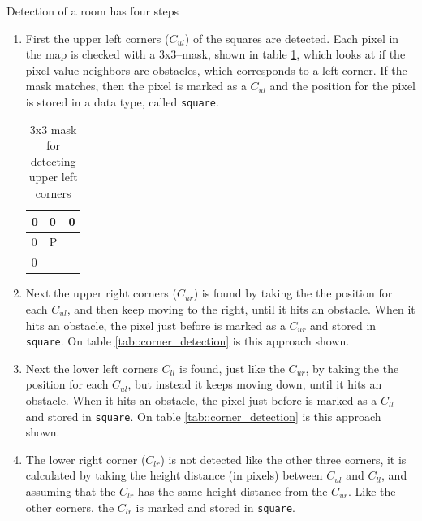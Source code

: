 Detection of a room has four steps
\begin{enumerate}\itemsep-3pt
\item First the upper left corners ($C_{ul}$) of the squares are detected. Each pixel in the map is checked with a 3x3--mask, shown in table \ref{tab::ul_mask}, which looks at if the pixel value neighbors are obstacles, which corresponds to a left corner. If the mask matches, then the pixel is marked as a $C_{ul}$ and the position for the pixel is stored in a data type, called \lstinline|square|. 

\begin{table}[H]
\centering
\begin{tabular}{|l|l|l|}
\hline
0 & 0 & 0 \\ \hline
0 & P &   \\ \hline
0 &   &   \\ \hline
\end{tabular}
\caption{3x3 mask for detecting upper left corners}
\label{tab::ul_mask}
\end{table}

\item Next the upper right corners ($C_{ur}$) is found by taking the the position for each $C_{ul}$, and then keep moving to the right, until it hits an obstacle. When it hits an obstacle, the pixel just before is marked as a $C_{ur}$ and stored in \lstinline|square|. On table \ref{tab::corner_detection} is this approach shown.
\item Next the lower left corners $C_{ll}$ is found, just like the $C_{ur}$, by taking the the position for each $C_{ul}$, but instead it keeps moving down, until it hits an obstacle. When it hits an obstacle, the pixel just before is marked as a $C_{ll}$ and stored in \lstinline|square|. On table \ref{tab::corner_detection} is this approach shown. 
\item The lower right corner ($C_{lr}$) is not detected like the other three corners, it is calculated by taking the height distance (in pixels) between $C_{ul}$ and $C_{ll}$, and assuming that the $C_{lr}$ has the same height distance from the $C_{ur}$. Like the other corners, the $C_{lr}$ is marked and stored in \lstinline|square|. 
\end{enumerate} 

